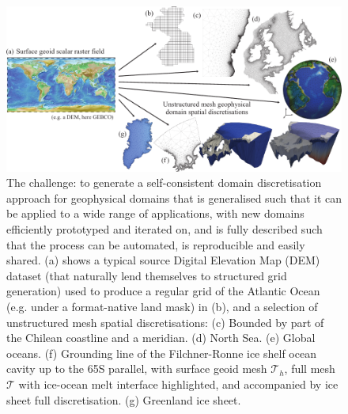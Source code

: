 \documentclass[a4paper, 10pt]{book}
\begin{document}
%
%
\begin{figure}[!h]
\begin{center}
\includegraphics[width=\textwidth]{fig/challenge_diverse.pdf}
\end{center}
\caption{%
The challenge:
to generate a self-consistent domain discretisation approach for geophysical domains
that is generalised such that it can be applied to a wide range of applications,
with new domains efficiently prototyped and iterated on,
and is fully described such that 
the process can be automated,
is reproducible
and easily shared.
(a) shows a typical source Digital Elevation Map (DEM) dataset
(that naturally lend themselves to structured grid generation)
used to produce a regular grid of the Atlantic Ocean (e.g. under a format-native land mask) in (b),
and a selection of
unstructured mesh spatial discretisations:
(c) Bounded by part of the Chilean coastline and a meridian.
(d) North Sea.
(e) Global oceans.
(f) Grounding line of the Filchner-Ronne ice shelf ocean cavity up to the 65\degree S parallel, with
surface geoid mesh $\mathcal{T}_h$,
full mesh $\mathcal{T}$ with ice-ocean melt interface highlighted,
and accompanied by ice sheet full discretisation.
(g) Greenland ice sheet.
}
\label{fig:challenge}
\end{figure}
\end{document}
